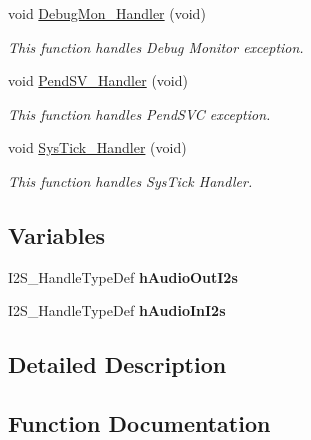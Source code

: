 \begin{DoxyCompactItemize}
void \mbox{\hyperlink{group___templates_gadbdfb05858cc36fc520974df37ec3cb0}{Debug\+Mon\+\_\+\+Handler}} (void)
\begin{DoxyCompactList}\small\item\em This function handles Debug Monitor exception. \end{DoxyCompactList}\item 
void \mbox{\hyperlink{group___templates_ga6303e1f258cbdc1f970ce579cc015623}{Pend\+S\+V\+\_\+\+Handler}} (void)
\begin{DoxyCompactList}\small\item\em This function handles Pend\+S\+VC exception. \end{DoxyCompactList}\item 
void \mbox{\hyperlink{group___templates_gab5e09814056d617c521549e542639b7e}{Sys\+Tick\+\_\+\+Handler}} (void)
\begin{DoxyCompactList}\small\item\em This function handles Sys\+Tick Handler. \end{DoxyCompactList}\end{DoxyCompactItemize}
\subsection*{Variables}
\begin{DoxyCompactItemize}
\item 
\mbox{\label{group___templates_ga9734e3359903aa5c2318ce34dd5ac3a2}} 
I2\+S\+\_\+\+Handle\+Type\+Def {\bfseries h\+Audio\+Out\+I2s}
\item 
\mbox{\label{group___templates_ga6747a14576e091de69a037af315fe89b}} 
I2\+S\+\_\+\+Handle\+Type\+Def {\bfseries h\+Audio\+In\+I2s}
\end{DoxyCompactItemize}


\subsection{Detailed Description}


\subsection{Function Documentation}
\mbox{\label{group___templates_ga850cefb17a977292ae5eb4cafa9976c3}} 
